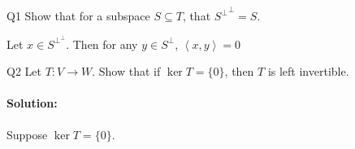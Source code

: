 \documentclass{article}
\begin{document}
\begin{prob}{Q1}
    Show that for a subspace  $S\subseteq T$, that ${S^{\perp}}^{\perp}=S$.
\end{prob}

Let $x\in S^{\perp^{\perp}}$. Then for any $y\in S^{\perp}$, $\left<x,y \right>=0$

\begin{prob}{Q2}
    Let $T:V\to W$. Show that if $\ker T=\{0\} $, then $T$ is left invertible.
\end{prob}
\paragraph{Solution:} Suppose $\ker T=\{0\} $. 
\end{document}
